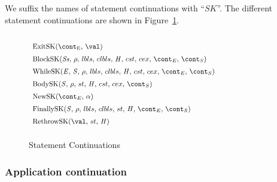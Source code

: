 \documentclass{article}
\newcounter{rowcount}[figure]
\newcounter{figurecount}
\newcommand{\myrowcount}{\refstepcounter{rowcount}\thesubsection.\thefigurecount.\therowcount}
\newcommand{\labeledrow}[1]{\myrowcount\label{#1}}
\begin{document}
\noindent
We suffix the names of statement continuations with ``$SK$''.
The different statement continuations are shown in Figure~\ref{figure:sconts}.
\newcommand{\ExitSK}[1]{\mathrm{ExitSK(\econt,\,#1)}}
\newcommand{\BlockSK}[2]{\mathrm{BlockSK}({#1},\,{#2},\,\lbls,\,\clbls,\,\handler,\,\cstrace,\,\cex,\,\econt,\,\scont)}
\newcommand{\WhileSK}{\mathrm{WhileSK}(\expr,\,\stmt,\,\env,\,\lbls,\,\clbls,\,\handler,\,\cstrace,\,\cex,\,\econt,\,\scont)}
\newcommand{\BodySK}[3]{\mathrm{BodySK}({#1},\,{#2},\,\strace,\,\handler,\,\cstrace,\,\cex,\,{#3})}
\newcommand{\NewSK}[2]{\mathrm{NewSK}({#1},\,{#2})}
\newcommand{\FinallySK}[1]{\mathrm{FinallySK}({#1},\,\env,\,\lbls,\,\clbls,\,\strace,\,\handler,\,\econt,\,\scont)}
\newcommand{\RethrowSK}[3]{\mathrm{RethrowSK}({#1},\,{#2},\,{#3})}
%
%
\begin{figure}[Htp]
  $
  \begin{array}{lll@{\hspace{5cm}}}
  	&&\\
	\ExitSK{\val}\\[2mm]

	\BlockSK{\stmts}{\env}&\\[2mm]

	\WhileSK&\\[2mm]

	\BodySK{\stmt}{\env}{\scont}&\\[2mm]

	\NewSK{\econt}{\loc}&\\[2mm]

	\FinallySK{\stmt}&\\[2mm]

	\RethrowSK{\val}{\strace}{\handler}&\\[2mm]
  \end{array}
  $
  \caption{Statement Continuations}
  \label{figure:sconts}
\end{figure}

\subsubsection{Application continuation}
\label{subsubsec:application-continuation}
\end{document}
